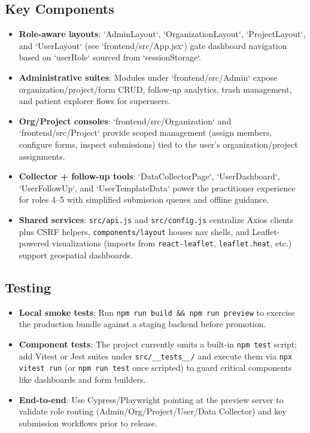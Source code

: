 \documentclass[11pt]{article}
\begin{document}
\subsection{Key Components}
\begin{itemize}[leftmargin=*]
  \item \textbf{Role-aware layouts}: `AdminLayout`, `OrganizationLayout`, `ProjectLayout`, and `UserLayout` (see `frontend/src/App.jsx`) gate dashboard navigation based on `userRole` sourced from `sessionStorage`.
  \item \textbf{Administrative suites}: Modules under `frontend/src/Admin` expose organization/project/form CRUD, follow-up analytics, trash management, and patient explorer flows for superusers.
  \item \textbf{Org/Project consoles}: `frontend/src/Organization` and `frontend/src/Project` provide scoped management (assign members, configure forms, inspect submissions) tied to the user’s organization/project assignments.
  \item \textbf{Collector + follow-up tools}: `DataCollectorPage`, `UserDashboard`, `UserFollowUp`, and `UserTemplateData` power the practitioner experience for roles 4–5 with simplified submission queues and offline guidance.
  \item \textbf{Shared services}: \texttt{src/api.js} and \texttt{src/config.js} centralize Axios clients plus CSRF helpers, \texttt{components/layout} houses nav shells, and Leaflet-powered visualizations (imports from \texttt{react-leaflet}, \texttt{leaflet.heat}, etc.) support geospatial dashboards.
\end{itemize}

\subsection{Testing}
\begin{itemize}[leftmargin=*]
  \item \textbf{Local smoke tests}: Run \verb|npm run build && npm run preview| to exercise the production bundle against a staging backend before promotion.
  \item \textbf{Component tests}: The project currently omits a built-in \texttt{npm test} script; add Vitest or Jest suites under \texttt{src/\_\_tests\_\_/} and execute them via \verb|npx vitest run| (or \verb|npm run test| once scripted) to guard critical components like dashboards and form builders.
  \item \textbf{End-to-end}: Use Cypress/Playwright pointing at the preview server to validate role routing (Admin/Org/Project/User/Data Collector) and key submission workflows prior to release.
\end{itemize}
\end{document}
